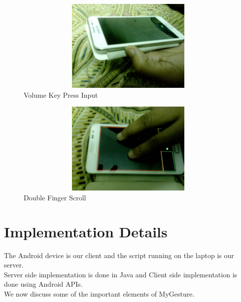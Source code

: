 \documentclass[10pt,conference,letterpaper]{IEEEtran}
\begin{document}
\begin{figure}
\centering
\includegraphics[width=120mm,height=45mm]{14.eps}
\caption{Volume Key Press Input}
\end{figure}
\begin{figure}
\centering
\includegraphics[width=120mm,height=45mm]{15.eps}
\caption{Double Finger Scroll}
\end{figure}

\section{Implementation Details}
The Android device is our client and the script running on the laptop is our server.\\
Server side implementation is done in Java and Client side implementation is done using Android APIs.\\
We now discuss some of the important elements of MyGesture.
\end{document}
